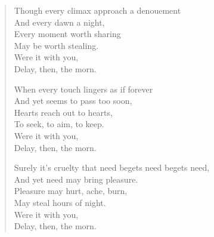 \begin{verse}
  Though every climax approach a denouement\\
  And every dawn a night,\\
  Every moment worth sharing\\
  May be worth stealing.\\
  \vin Were it with you,\\
  \vin Delay, then, the morn.

  When every touch lingers as if forever\\
  And yet seems to pass too soon,\\
  Hearts reach out to hearts,\\
  To seek, to aim, to keep.\\
  \vin Were it with you,\\
  \vin Delay, then, the morn.

  Surely it's cruelty that need begets need begets need,\\
  And yet need may bring pleasure.\\
  Pleasure may hurt, ache, burn,\\
  May steal hours of night.\\
  \vin Were it with you,\\
  \vin Delay, then, the morn.
\end{verse}
